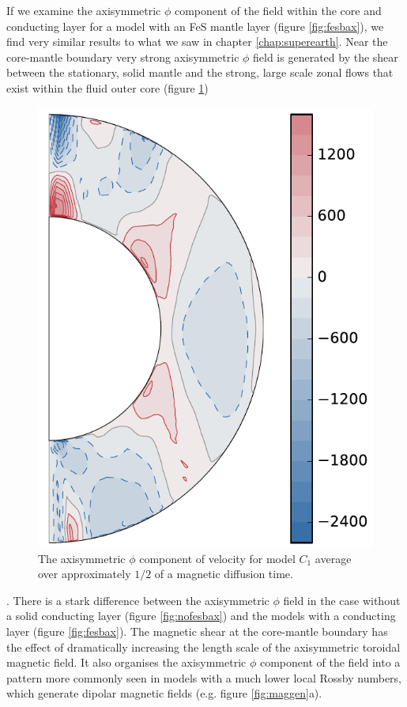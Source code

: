 If we examine the axisymmetric $\phi$ component of the field within the core and conducting layer for a model with an FeS mantle layer (figure \ref{fig:fesbax}), we find very similar results to what we saw in chapter \ref{chap:superearth}. Near the core-mantle boundary very strong axisymmetric $\phi$ field is generated by the shear between the stationary, solid mantle and the strong, large scale zonal flows that exist within the fluid outer core (figure \ref{fig:fesutor})
\begin{figure}
	\centering
        \includegraphics[width=.4\textwidth]{Chapter5/Figures/utor11_001_1100-1330.pdf} 
        \caption{The axisymmetric $\phi$ component of velocity for model $C_1$ average over approximately  $\text{1/2}$ of a magnetic diffusion time.}
        \label{fig:fesutor}
\end{figure}
. There is a stark difference between the axisymmetric $\phi$ field in the case without a solid conducting layer (figure \ref{fig:nofesbax}) and the models with a conducting layer (figure \ref{fig:fesbax}). The magnetic shear at the core-mantle boundary has the effect of dramatically increasing the length scale of the axisymmetric toroidal magnetic field. It also organises the axisymmetric $\phi$ component of the field into a pattern more commonly seen in models with a much lower local Rossby numbers, which generate dipolar magnetic fields (e.g. figure \ref{fig:maggen}a).

